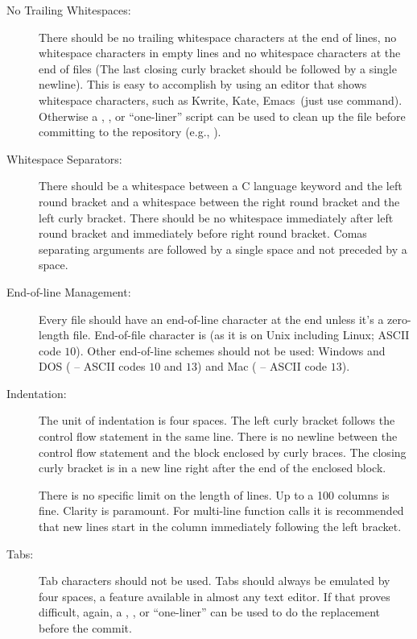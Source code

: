 \begin{description}
\item[No Trailing Whitespaces:]
There should be no trailing whitespace characters at the end of lines,
no whitespace characters in empty lines and no whitespace characters
at the end of files (The last closing curly bracket should be followed
by a single newline). This is easy to accomplish by using an editor that
shows whitespace characters, such as Kwrite, Kate, Emacs~(just use
 command). Otherwise a ,
, or  ``one-liner'' script can be used to clean up
the file before committing to the repository (e.g., ).

\item[Whitespace Separators:]
There should be a whitespace between a C language keyword and the left round
bracket and a whitespace between the right round bracket and the left curly
bracket. There should be no whitespace immediately after left round bracket
and immediately before right round bracket.
Comas separating arguments are followed by a single space and not preceded
by a space.

\item[End-of-line Management:]
Every file should have an end-of-line character at the end unless it's a
zero-length file. End-of-file character is  (as it
is on Unix including Linux; ASCII code $10$). Other end-of-line schemes should not be
used: Windows and DOS ( -- ASCII
codes $10$ and $13$) and Mac ( -- ASCII code
$13$).

\item[Indentation:]
The unit of indentation is four spaces. The left curly bracket follows the
control flow statement in the same line. There is no newline between the
control flow statement and the block enclosed by curly braces. The closing
curly bracket is in a new line right after the end of the enclosed block.

There is no specific limit on the length of lines. Up to a 100 columns is
fine. Clarity is paramount. For multi-line function calls it is recommended
that new lines start in the column immediately following the left bracket.

\item[Tabs:]
Tab characters should not be used. Tabs should always be emulated by four
spaces, a feature available in almost any text editor. If that proves
difficult, again, a , , or  ``one-liner'' can be used to do the replacement
before the commit.


\end{description}

